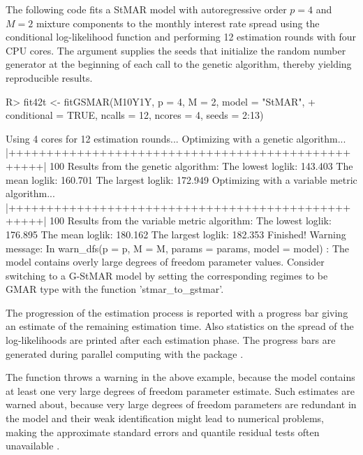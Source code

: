 \documentclass[nojss]{jss} %
\begin{document}
The following code fits a StMAR model with autoregressive order $p=4$ and $M=2$ mixture components to the monthly interest rate spread using the conditional log-likelihood function and performing 12 estimation rounds with four CPU cores. The argument  supplies the seeds that initialize the random number generator at the beginning of each call to the genetic algorithm, thereby yielding reproducible results.
%
\begin{CodeChunk}
\begin{CodeInput}
R> fit42t <- fitGSMAR(M10Y1Y, p = 4, M = 2, model = "StMAR",
+    conditional = TRUE, ncalls = 12, ncores = 4, seeds = 2:13)
\end{CodeInput}
\begin{CodeOutput}
Using 4 cores for 12 estimation rounds...
Optimizing with a genetic algorithm...
  |++++++++++++++++++++++++++++++++++++++++++++++++++| 100%
Results from the genetic algorithm:
The lowest loglik:  143.403
The mean loglik:    160.701
The largest loglik: 172.949
Optimizing with a variable metric algorithm...
  |++++++++++++++++++++++++++++++++++++++++++++++++++| 100%
Results from the variable metric algorithm:
The lowest loglik:  176.895
The mean loglik:    180.162
The largest loglik: 182.353
Finished!
Warning message:
In warn_dfs(p = p, M = M, params = params, model = model) :
  The model contains overly large degrees of freedom parameter values.
  Consider switching to a G-StMAR model by setting the corresponding
  regimes to be GMAR type with the function 'stmar_to_gstmar'.
\end{CodeOutput}
\end{CodeChunk}
%
The progression of the estimation process is reported with a progress bar giving an estimate of the remaining estimation time. Also statistics on the spread of the log-likelihoods are printed after each estimation phase. The progress bars are generated during parallel computing with the package  \citep{Solymos+Zawadzki:2020}.

The function throws a warning in the above example, because the model contains at least one very large degrees of freedom parameter estimate. Such estimates are warned about, because very large degrees of freedom parameters are redundant in the model and their weak identification might lead to numerical problems, making the approximate standard errors and quantile residual tests often unavailable \citep[Section 4]{Virolainen:2020}.
\end{document}
